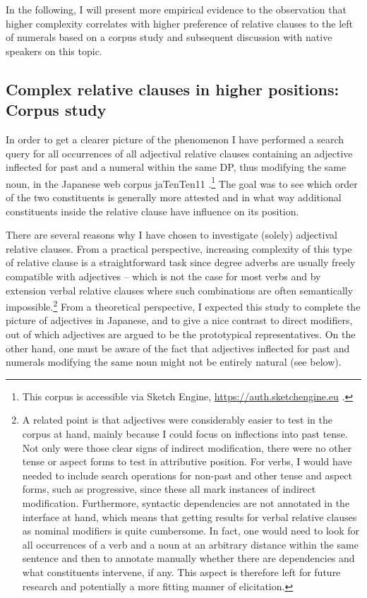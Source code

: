 \documentclass [output=book,colorlinks,citecolor=brown]{langscibook}
\begin{document}
In the following, I will present more empirical evidence to the observation that higher complexity correlates with higher preference of relative clauses to the left of numerals based on a corpus study and subsequent discussion with native speakers on this topic. %

\subsection{Complex relative clauses in higher positions: Corpus study}

In order to get a clearer picture of the phenomenon I have performed a search query for all occurrences of all adjectival relative clauses containing an adjective inflected for past and a numeral within the same DP, thus modifying the same noun, in the Japanese web corpus jaTenTen11 \citep{jakubi:2013:ten}.\footnote{This corpus is accessible via Sketch Engine, \url{https://auth.sketchengine.eu} \citep{kilgarriff:2014:sketch}.} The goal was to see which order of the two constituents is generally more attested and in what way additional constituents inside the relative clause have influence on its position. %

There are several reasons why I have chosen to investigate (solely) adjectival relative clauses. From a practical perspective, increasing complexity of this type of relative clause is a straightforward task since degree adverbs are usually freely compatible with adjectives -- which is not the case for most verbs and by extension verbal relative clauses where such combinations are often semantically impossible.\footnote{A related point is that adjectives were considerably easier to test in the corpus at hand, mainly because I could focus on inflections into past tense. Not only were those clear signs of indirect modification, there were no other tense or aspect forms to test in attributive position. For verbs, I would have needed to include search operations for non-past and other tense and aspect forms, such as progressive, since these all mark instances of indirect modification. Furthermore, syntactic dependencies are not annotated in the interface at hand, which means that getting results for verbal relative clauses as nominal modifiers is quite cumbersome. In fact, one would need to look for all occurrences of a verb and a noun at an arbitrary distance within the same sentence and then to annotate manually whether there are dependencies and what constituents intervene, if any. This aspect is therefore left for future research and potentially a more fitting manner of elicitation.} From a theoretical perspective, I expected this study to complete the picture of adjectives in Japanese, and to give a nice contrast to direct modifiers, out of which adjectives are argued to be the prototypical representatives. On the other hand, one must be aware of the fact that adjectives inflected for past and numerals modifying the same noun might not be entirely natural (see below). %
\end{document}
